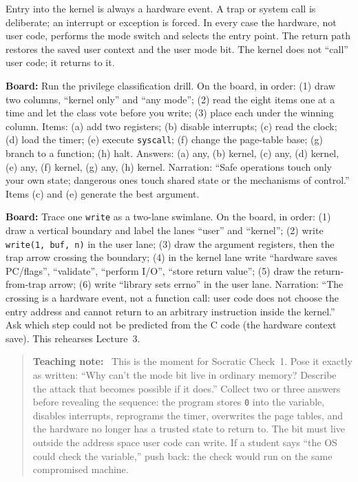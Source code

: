 \documentclass[11pt]{article}
\newenvironment{teachingaside}{\begin{quote}\small\color{primary-gold}\textbf{Teaching note:}\ }{\end{quote}}
\begin{document}
Entry into the kernel is always a  hardware event. A trap or system call is deliberate; an interrupt or exception is forced. In every case the hardware, not user code, performs the mode switch and selects the entry point. The return path restores the saved user context and the user mode bit. The kernel does not ``call'' user code; it returns to it.

\noindent\textbf{Board:} Run the privilege classification drill. On the board, in order: (1) draw two columns, ``kernel only'' and ``any mode''; (2) read the eight items one at a time and let the class vote before you write; (3) place each under the winning column. Items: (a) add two registers; (b) disable interrupts; (c) read the clock; (d) load the timer; (e) execute \texttt{syscall}; (f) change the page-table base; (g) branch to a function; (h) halt. Answers: (a) any, (b) kernel, (c) any, (d) kernel, (e) any, (f) kernel, (g) any, (h) kernel. Narration: ``Safe operations touch only your own state; dangerous ones touch shared state or the mechanisms of control.'' Items (c) and (e) generate the best argument.

\noindent\textbf{Board:} Trace one \texttt{write} as a two-lane swimlane. On the board, in order: (1) draw a vertical boundary and label the lanes ``user'' and ``kernel''; (2) write \texttt{write(1, buf, n)} in the user lane; (3) draw the argument registers, then the trap arrow crossing the boundary; (4) in the kernel lane write ``hardware saves PC/flags'', ``validate'', ``perform I/O'', ``store return value''; (5) draw the return-from-trap arrow; (6) write ``library sets errno'' in the user lane. Narration: ``The crossing is a hardware event, not a function call: user code does not choose the entry address and cannot return to an arbitrary instruction inside the kernel.'' Ask which step could not be predicted from the C code (the hardware context save). This rehearses Lecture~3.

\begin{teachingaside}
This is the moment for Socratic Check~1. Pose it exactly as written: ``Why can't the mode bit live in ordinary memory? Describe the attack that becomes possible if it does.'' Collect two or three answers before revealing the sequence: the program stores \texttt{0} into the variable, disables interrupts, reprograms the timer, overwrites the page tables, and the hardware no longer has a trusted state to return to. The bit must live outside the address space user code can write. If a student says ``the OS could check the variable,'' push back: the check would run on the same compromised machine.
\end{teachingaside}
\end{document}
